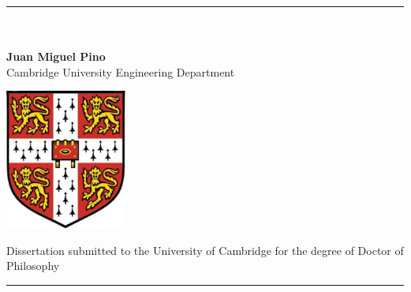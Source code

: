 \begin{titlepage}
\begin{center}
\rule{\textwidth}{1pt} \\
\vspace*{2.3cm}
 \\
\vspace*{0.8cm}
\noindent \Large \textbf{Juan Miguel Pino} \\
\vspace*{0.8cm}
Cambridge University Engineering Department \\
\vspace*{1.5cm}
\begin{center}
\includegraphics[width=4cm]{figures/shield.eps}
\end{center}
\vspace*{1.5cm}
\noindent \normalsize Dissertation submitted to the University of Cambridge for the degree of Doctor of Philosophy \\
\vfill
\rule{\textwidth}{1pt} \\
\end{center}
\end{titlepage}
